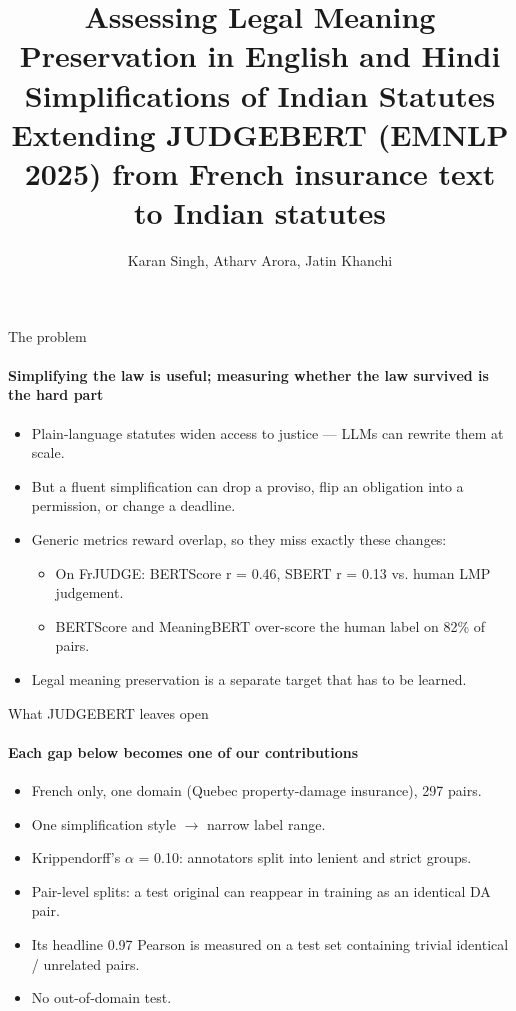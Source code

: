 \documentclass[aspectratio=169,11pt]{beamer}
\title{Assessing Legal Meaning Preservation in English and Hindi Simplifications of Indian Statutes Extending JUDGEBERT (EMNLP 2025) from French insurance text to Indian statutes}
\author{Karan Singh, Atharv Arora, Jatin Khanchi}
\institute{Bennett University, Greater Noida, India\\[0.3em]CSET 346 Natural Language Processing (project PID-08), instructor Dr. Surabhi Solanki}
\date{}
\begin{document}
\begin{frame}[plain]
\titlepage
\end{frame}

\begin{frame}{The problem}
\framesubtitle{Simplifying the law is useful; measuring whether the law survived is the hard part}
\small
\begin{itemize}
\item Plain-language statutes widen access to justice — LLMs can rewrite them at scale.
\item But a fluent simplification can drop a proviso, flip an obligation into a permission, or change a deadline.
\item Generic metrics reward overlap, so they miss exactly these changes:
\begin{itemize}\small
\item On FrJUDGE: BERTScore r = 0.46, SBERT r = 0.13 vs. human LMP judgement.
\item BERTScore and MeaningBERT over-score the human label on 82\% of pairs.
\end{itemize}
\item Legal meaning preservation is a separate target that has to be learned.
\end{itemize}
\end{frame}

\begin{frame}{What JUDGEBERT leaves open}
\framesubtitle{Each gap below becomes one of our contributions}
\begin{itemize}
\item French only, one domain (Quebec property-damage insurance), 297 pairs.
\item One simplification style \ensuremath{\rightarrow} narrow label range.
\item Krippendorff's \ensuremath{\alpha} = 0.10: annotators split into lenient and strict groups.
\item Pair-level splits: a test original can reappear in training as an identical DA pair.
\item Its headline 0.97 Pearson is measured on a test set containing trivial identical / unrelated pairs.
\item No out-of-domain test.
\end{itemize}
\end{frame}
\end{document}

